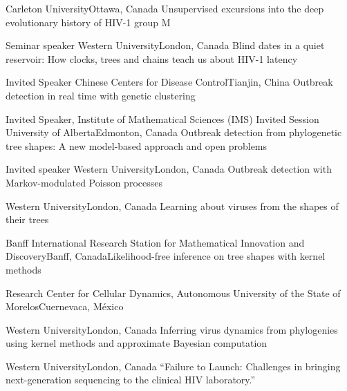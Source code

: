{Carleton University}{Ottawa, Canada}
{Unsupervised excursions into the deep evolutionary history of HIV-1 group M}

{Seminar speaker}
{Western University}{London, Canada}
{Blind dates in a quiet reservoir: How clocks, trees and chains teach us about HIV-1 latency}

{Invited Speaker}
{Chinese Centers for Disease Control}{Tianjin, China}
{Outbreak detection in real time with genetic clustering}

{Invited Speaker, Institute of Mathematical Sciences (IMS) Invited Session}
{University of Alberta}{Edmonton, Canada}
{Outbreak detection from phylogenetic tree shapes: A new model-based approach and open problems}

{Invited speaker}
{Western University}{London, Canada}
{Outbreak detection with Markov-modulated Poisson processes}

{Western University}{London, Canada}
{Learning about viruses from the shapes of their trees}

{Banff International Research Station for Mathematical Innovation and Discovery}{Banff, Canada}{Likelihood-free inference on tree shapes with kernel methods}

{Research Center for Cellular Dynamics, Autonomous University of the State of Morelos}{Cuernevaca, M\'exico}
{}

{Western University}{London, Canada}
{Inferring virus dynamics from phylogenies using kernel methods and approximate Bayesian computation}

{Western University}{London, Canada}
{``Failure to Launch: Challenges in bringing next-generation sequencing to the clinical HIV laboratory.''}

